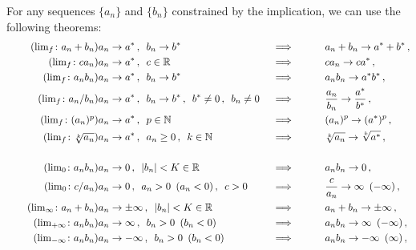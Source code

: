 \documentclass[week=3]{homework}
\begin{document}
\begin{questions}
	    For any sequences $\{a_n\}$ and $\{b_n\}$ constrained by the implication, we can use the following theorems:	    
	    \begin{alignat}{3}
		    \label{th:lim:a+b:finite} \tag{$\lim_f\colon a_n+b_n$}		a_n &\to a^* \,, \enskip b_n \to b^* \qquad &&\implies \qquad &&a_n + b_n \to a^* + b^*\,, \\
		    \label{th:lim:c*a:finite} \tag{$\lim_f\colon ca_n$}	a_n &\to a^* \,, \enskip c \in \reals \qquad &&\implies \qquad &&ca_n \to ca^*\,, \\
	    	\label{th:lim:a*b:finite} \tag{$\lim_f\colon a_nb_n$}	a_n &\to a^* \,, \enskip b_n \to b^* \qquad &&\implies \qquad &&a_nb_n \to a^*b^*\,, \\
	    	\label{th:lim:a/b:finite} \tag{$\lim_f\colon a_n/b_n$}		a_n &\to a^* \,, \enskip b_n \to b^* \,, \enskip b^* \neq 0\,, \enskip b_n \neq 0 &&\implies \qquad &&\frac{a_n}{b_n} \to \frac{a^*}{b^*} \,, \\
	    	\label{th:lim:a^p:finite} \tag{$\lim_f\colon (a_n)^p$}		a_n &\to a^* \,, \enskip p \in \naturals \qquad &&\implies \qquad &&(a_n)^p \to (a^*)^p \,, \\
	    	\label{th:lim:k root a:finite} \tag{$\lim_f\colon \sqrt[k]{a_n}$}	a_n &\to a^* \,, \enskip a_n \geq 0\,, \enskip k \in \naturals \quad &&\implies \qquad &&\sqrt[k]{a_n} \to \sqrt[k]{a^*} \,, \\
	    	\nonumber\\
	    	\label{th:lim:a->0*b:finite} \tag{$\lim_0\colon a_nb_n$}	a_n &\to 0 \,, \enskip |b_n| < K \in \reals \quad &&\implies \qquad &&a_nb_n \to 0\,, \\
	    	\label{th:lim:c/a->0:finite} \tag{$\lim_0\colon c/a_n$}	a_n &\to 0 \,, \enskip a_n > 0\enskip (a_n < 0)\,, \enskip c>0 \quad &&\implies \qquad &&\frac{c}{a_n} \to \infty \enskip (-\infty)\,, \\
	    	\label{th:lim:a+b:infinite} \tag{$\lim_\infty\colon a_n + b_n$}	a_n &\to \pm\infty \,, \enskip |b_n| < K \in \reals \quad &&\implies \qquad &&a_n + b_n \to \pm\infty\,, \\	
	    	\label{th:lim:a*b:infinite+} \tag{$\lim_{+\infty}\colon a_nb_n$}	a_n &\to \infty \,, \enskip b_n > 0 \enskip (b_n < 0) \quad &&\implies \qquad &&a_nb_n \to \infty \enskip (-\infty)\,, \\
	    	\label{th:lim:a*b:infinite-} \tag{$\lim_{-\infty}\colon a_nb_n$}	a_n &\to -\infty \,, \enskip b_n > 0 \enskip (b_n < 0) \quad &&\implies \qquad &&a_nb_n \to -\infty \enskip (\infty)\,, \\

\end{alignat}
\end{questions}
\end{document}
